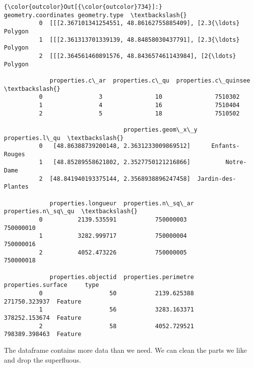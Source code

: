 \documentclass[11pt]{article}
\begin{document}
\begin{Verbatim}[commandchars=\\\{\}]
{\color{outcolor}Out[{\color{outcolor}734}]:}                                 geometry.coordinates geometry.type  \textbackslash{}
          0  [[[2.367101341254551, 48.86162755885409], [2.3{\ldots}       Polygon   
          1  [[[2.361313701339139, 48.84858030437791], [2.3{\ldots}       Polygon   
          2  [[[2.364561460891576, 48.843657461143984], [2{\ldots}       Polygon   
          
             properties.c\_ar  properties.c\_qu  properties.c\_quinsee  \textbackslash{}
          0                3               10               7510302   
          1                4               16               7510404   
          2                5               18               7510502   
          
                                  properties.geom\_x\_y     properties.l\_qu  \textbackslash{}
          0   [48.86388739200148, 2.3631233009869512]      Enfants-Rouges   
          1   [48.85289558621802, 2.3527750121216866]          Notre-Dame   
          2  [48.841940193375144, 2.3568938896247458]  Jardin-des-Plantes   
          
             properties.longueur  properties.n\_sq\_ar  properties.n\_sq\_qu  \textbackslash{}
          0          2139.535591           750000003           750000010   
          1          3282.999717           750000004           750000016   
          2          4052.473226           750000005           750000018   
          
             properties.objectid  properties.perimetre  properties.surface     type  
          0                   50           2139.625388       271750.323937  Feature  
          1                   56           3283.163371       378252.153674  Feature  
          2                   58           4052.729521       798389.398463  Feature  
\end{Verbatim}
            
    The dataframe contains more data than we need. We can clean the parts we
like and drop the superfluous.
\end{document}

